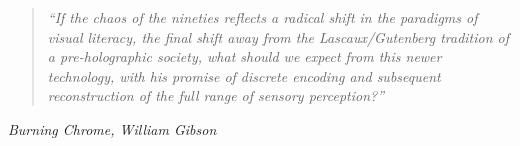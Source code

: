 \begin{quote}
	\textit{``If the chaos of the nineties reflects a radical shift in the paradigms of visual literacy, the final shift away from the Lascaux/Gutenberg tradition of a pre-holographic society, what should we expect from this newer technology, with his promise of discrete encoding and subsequent reconstruction of the full range of sensory perception?''}
\end{quote}
\hfill \textit{Burning Chrome, William Gibson}
\\
\\
\\



